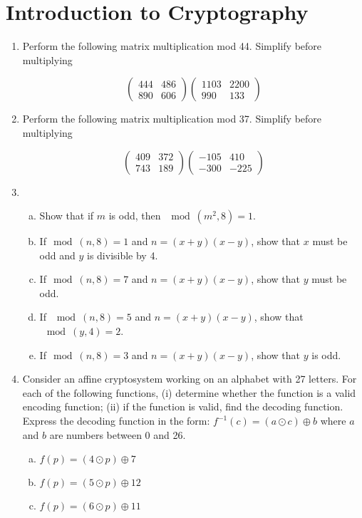 \section{Introduction to Cryptography}

\begin{enumerate}

\item
Perform the following matrix multiplication mod 44. Simplify before multiplying

$$\left(
\begin{array}{cc}
444 & 486 \\
890 & 606
\end{array}
\right)
\left(
\begin{array}{cc}
1103 & 2200 \\
990 & 133
\end{array}
\right)$$

\item
Perform the following matrix multiplication mod 37. Simplify before multiplying

$$\left(
\begin{array}{cc}
409 & 372 \\
743 & 189
\end{array}
\right)
\left(
\begin{array}{cc}
-105 & 410 \\
 -300& -225
\end{array}
\right)$$

\item
\begin{enumerate}[(a)]
\item
Show that if $m$ is odd, then $\mod(m^2,8) = 1$.

\item
If$\mod(n,8)=1$ and $n = (x+y)(x-y)$, show that  $x$ must be odd and $y$ is divisible by 4.

\item
If$\mod(n,8)=7$ and $n = (x+y)(x-y)$, show that  $y$ must be odd.

\item
If $\mod(n,8)=5$ and $n = (x+y)(x-y)$, show that  $\mod(y,4) = 2$.

\item
If$\mod(n,8)=3$ and $n = (x+y)(x-y)$, show that  $y$ is odd.
\end{enumerate}

\item 
Consider an affine cryptosystem working on an alphabet with 27 letters. For each of the following functions, (i) determine whether the  function is a valid encoding function; (ii) if the function is valid, find the decoding function. Express the decoding function in the form: $f^{-1}(c) = (a\odot c) \oplus b$ where $a$ and $b$ are numbers between 0 and 26.
\begin{enumerate}[(a)]
\item
$f(p) = (4 \odot p) \oplus 7$
\item	
$f(p) = (5 \odot p) \oplus 12$ 
\item
$f(p) = (6 \odot p) \oplus  11$
\end{enumerate}


\end{enumerate}

